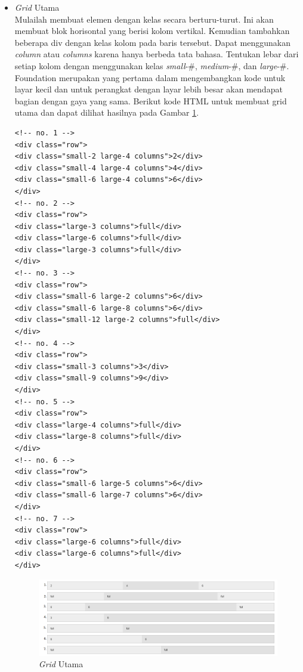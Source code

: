 \begin{itemize}
\begin{itemize}
\begin{enumerate}[(1)]
\begin{itemize}
\item {\it Grid} Utama\\
Mulailah membuat elemen dengan kelas secara berturu-turut. Ini akan membuat
blok horisontal yang berisi kolom vertikal. Kemudian tambahkan beberapa div
dengan kelas kolom pada baris tersebut. Dapat menggunakan {\it column} atau
{\it columns} karena hanya berbeda tata bahasa. Tentukan lebar dari setiap
kolom dengan menggunakan kelas {\it small}-\#, {\it medium}-\#, dan
{\it large}-\#.
Foundation merupakan yang pertama dalam mengembangkan kode untuk layar kecil
dan untuk perangkat dengan layar lebih besar akan mendapat bagian dengan gaya yang
sama. Berikut kode HTML untuk membuat grid utama dan dapat dilihat hasilnya
pada Gambar \ref{fig:gridutama}.
\begin{lstlisting}[basicstyle=\footnotesize]
<!-- no. 1 -->
<div class="row">
<div class="small-2 large-4 columns">2</div>
<div class="small-4 large-4 columns">4</div>
<div class="small-6 large-4 columns">6</div>
</div>
<!-- no. 2 -->
<div class="row">
<div class="large-3 columns">full</div>
<div class="large-6 columns">full</div>
<div class="large-3 columns">full</div>
</div>
<!-- no. 3 -->
<div class="row">
<div class="small-6 large-2 columns">6</div>
<div class="small-6 large-8 columns">6</div>
<div class="small-12 large-2 columns">full</div>
</div>
<!-- no. 4 -->
<div class="row">
<div class="small-3 columns">3</div>
<div class="small-9 columns">9</div>
</div>
<!-- no. 5 -->
<div class="row">
<div class="large-4 columns">full</div>
<div class="large-8 columns">full</div>
</div>
<!-- no. 6 -->
<div class="row">
<div class="small-6 large-5 columns">6</div>
<div class="small-6 large-7 columns">6</div>
</div>
<!-- no. 7 -->
<div class="row">
<div class="large-6 columns">full</div>
<div class="large-6 columns">full</div>
</div>
\end{lstlisting}
\begin{figure}[H]
\centering
\includegraphics[scale=0.6]{Gambar/gridutama.png}
\caption[{\it Grid} Utama]{{\it Grid} Utama}
\label{fig:gridutama}
\end{figure}

\end{itemize}
\end{enumerate}
\end{itemize}
\end{itemize}
